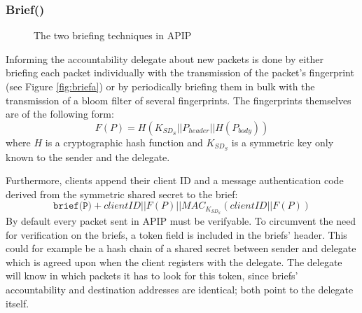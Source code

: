 \documentclass{acm_proc_article-sp}
\begin{document}
\subsubsection{Brief()}
\begin{figure}[!tbp]
  \centering
  \hfill
  \caption{The two briefing techniques in APIP \cite{apip}}
\end{figure}
Informing the accountability delegate about new packets is done by either briefing each packet individually with the transmission of the packet's fingerprint (see Figure \ref{fig:briefa}) or by periodically briefing them in bulk with the transmission of a bloom filter of several fingerprints. The fingerprints themselves are of the following form:
\begin{equation}
F(P) = H(K_{SD_S} || P_{header} || H(P_{body} ))
\end{equation}
where $H$ is a cryptographic hash function and $K_{SD_S}$ is a symmetric key only known to the sender and the delegate.

Furthermore, clients append their client ID and a message authentication code derived from the symmetric shared secret to the brief:
\begin{equation}
\texttt{brief(P)} + clientID || F(P) || MAC_{K_{{SD}_S}}(clientID || F(P))
\end{equation}
By default every packet sent in APIP must be verifyable. To circumvent the need for verification on the briefs, a token field is included in the briefs' header. This could for example be a hash chain of a shared secret between sender and delegate which is agreed upon when the client registers with the delegate. The delegate will know in which packets it has to look for this token, since briefs' accountability and destination addresses are identical; both point to the delegate itself.
\end{document}
